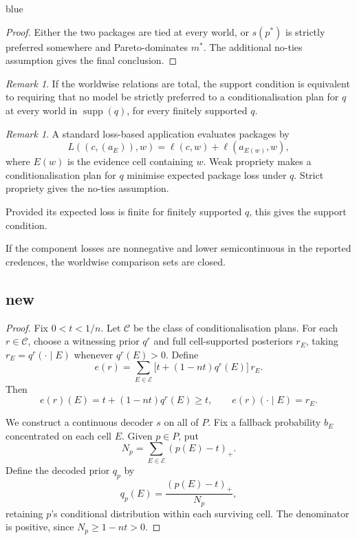 \documentclass[11pt]{article}
\theoremstyle{definition}
\theoremstyle{remark}
\newtheorem{remark}[theorem]{Remark}
\newcommand{\supp}{\operatorname{supp}}
\newenvironment{AIwritten}{\begin{color}{blue}}{\end{color}}
\begin{document}
\begin{AIwritten}
\begin{proof}
		Either the two packages are tied at every world,
		or $s(p^*)$ is strictly preferred somewhere and
		Pareto-dominates $m^*$. The additional no-ties
		assumption gives the final conclusion.
	\end{proof}
	
	\begin{remark}
		If the worldwise relations are total, the support
		condition is equivalent to requiring that no model
		be strictly preferred to a conditionalisation plan
		for $q$ at every world in $\supp(q)$, for every
		finitely supported $q$.
	\end{remark}
	
	\begin{remark}
		A standard loss-based application evaluates packages by
		\[
		L((c,(a_E)),w)
		=\ell(c,w)+\ell(a_{E(w)},w),
		\]
		where $E(w)$ is the evidence cell containing $w$.
		Weak propriety makes a conditionalisation plan for $q$
		minimise expected package loss under $q$.
		Strict propriety gives the no-ties assumption.
		
		Provided its expected loss is finite for finitely
		supported $q$, this gives the support condition.
		
		If the component losses are nonnegative and lower
		semicontinuous in the reported credences, the
		worldwise comparison sets are closed.
	\end{remark}
	
	
	
	
	\subsection{new}
	
	\begin{proof}
		Fix $0<t<1/n$. Let $\mathcal C$ be the class of
		conditionalisation plans. For each $r\in\mathcal C$,
		choose a witnessing prior $q^r$ and full
		cell-supported posteriors $r_E$, taking
		$r_E=q^r(\cdot\mid E)$ whenever $q^r(E)>0$.
		Define
		\[
		e(r)=\sum_{E\in\mathcal E}
		\bigl[t+(1-nt)q^r(E)\bigr]\,r_E.
		\]
		Then
		\[
		e(r)(E)=t+(1-nt)q^r(E)\ge t,
		\qquad
		e(r)(\cdot\mid E)=r_E.
		\]
		
		We construct a continuous decoder $s$ on all of $P$.
		Fix a fallback probability $b_E$ concentrated on
		each cell $E$. Given $p\in P$, put
		\[
		N_p=\sum_{E\in\mathcal E}(p(E)-t)_+.
		\]
		Define the decoded prior $q_p$ by
		\[
		q_p(E)=\frac{(p(E)-t)_+}{N_p},
		\]
		retaining $p$'s conditional distribution within
		each surviving cell. The denominator is positive,
		since $N_p\ge1-nt>0$.
		

\end{proof}
\end{AIwritten}
\end{document}
